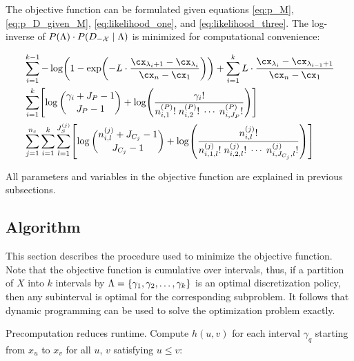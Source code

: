 The objective function can be formulated given equations \ref{eq:p_M}, \ref{eq:p_D_given_M}, \ref{eq:likelihood_one}, and \ref{eq:likelihood_three}.
The log-inverse of $P(\Lambda) \cdot P(D_{-\mathcal{X}} \mid \Lambda)$ is minimized for computational convenience:

\begin{equation}
\label{eq:opt_prob}
\begin{aligned}
  & \sum_{i=1}^{k-1}
   - \log
    \paren{
      1 - \exp
      \paren{
        - L \cdot  \frac{
                         \cx_{\lambda_i +1} - \cx_{\lambda_i}
                       }{
                         \cx_n - \cx_1
                        }
      }
    }
      + \sum_{i=1}^{k}
      L \cdot \frac{\cx_{\lambda_{i}} - \cx_{\lambda_{i-1} + 1}}{\cx_n - \cx_1} \\
  & \sum_{i=1}^{k} \brock{
  \log{{\gamma_i + J_P - 1}\choose{J_P - 1}}
  +{ \log \paren{
        \frac{
          {\gamma_i}!
        }{
          {n^{({P})}_{i,1}}! \; {n^{({P})}_{i,2}}! \; \cdots \; {n^{({P})}_{i,J_P}}!
        }
      }}
  } \\
  & \sum_{j=1}^{n_c} \sum_{i=1}^k \sum_{l=1}^{J^{(j)}_S} \brock{
  { \log
          {{n^{(j)}_{i,l} + J_{C_j} - 1}\choose{J_{C_j}-1}}}        
    +
    \log \paren{ {
          \frac{
            {n^{(j)}_{i,l}}!
          }{
            {n^{(j)}_{i,1,l}!} \; {n^{(j)}_{i,2,l}!} \; \cdots \; {n^{(j)}_{i,J_{C_j},l}!}
          }
        }        
        } }
\end{aligned}
\end{equation}

All parameters and variables in the objective function are explained in previous subsections.

\subsection{Algorithm}

This section describes the procedure used to minimize the objective function.
Note that the objective function is cumulative over intervals, thus, if a partition of $X$ into $k$ intervals by $\Lambda = \curly{\gamma_1 , \gamma_2  , \ldots , \gamma_k}$ is an optimal discretization policy, then any subinterval is optimal for the corresponding subproblem.
It follows that dynamic programming can be used to solve the optimization problem exactly.

Precomputation reduces runtime.
Compute $h(u,v)$ for each interval $\gamma_q$ starting from $x_{u}$ to $x_{v}$ for all $u$, $v$ satisfying $u \leq v$:

